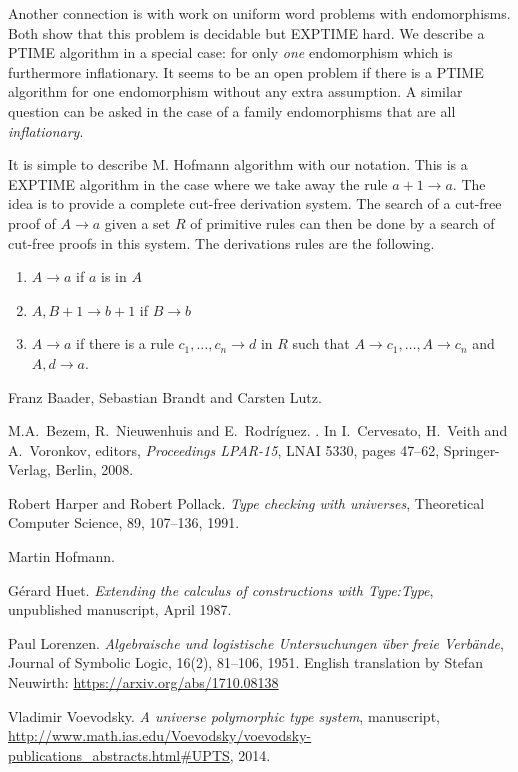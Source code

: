 \documentclass[11pt,a4paper]{article}
\begin{document}
Another connection is with work on uniform word problems with
endomorphisms. Both \cite{Baader,Hofmann} show that this problem is decidable
but EXPTIME hard. We describe a PTIME algorithm in a special case: for
only {\em one} endomorphism which is furthermore inflationary.
It seems to be an open problem if there is a PTIME algorithm for
one endomorphism without any extra assumption. A similar
question can be asked in the case of a family endomorphisms
that are all {\em inflationary}.

It is simple to describe M. Hofmann \cite{Hofmann} algorithm with
our notation. This is a EXPTIME algorithm in the case where
we take away the rule $a+1\to a$. The idea is to provide a complete cut-free
derivation system. The search of a cut-free
proof of $A\to a$ given a set $R$ of primitive rules can then be done by a search of cut-free
proofs in this system. The derivations rules are the following.

\begin{enumerate}
\item $A\to a$ if $a$ is in $A$
\item $A,B+1\to b+1$ if $B\to b$
\item $A\to a$ if there is a rule $c_1,\dots,c_n\to d$ in $R$ such that 
  $A\to c_1,\dots,A\to c_n$ and $A,d\to a$.
\end{enumerate}






\begin{thebibliography}{99}

  Franz Baader, Sebastian Brandt and Carsten Lutz.

M.A.~Bezem, R.~Nieuwenhuis and E.~Rodr\'iguez.
.
In I.~Cervesato, H.~Veith and A.~Voronkov, editors,
\emph{Proceedings LPAR-15}, LNAI 5330,
pages 47--62, Springer-Verlag, Berlin, 2008.

Robert Harper and Robert Pollack.
\newblock\emph{Type checking with universes},
Theoretical Computer Science, 89, 107--136, 1991.

  Martin Hofmann.

G\'erard Huet.
\newblock\emph{Extending the calculus of constructions with {Type:Type}},
\newblock unpublished manuscript, April 1987.

Paul Lorenzen.
  \newblock\emph{Algebraische und logistische Untersuchungen über freie Verbände},
Journal of Symbolic Logic, 16(2), 81--106, 1951.
English translation by Stefan Neuwirth: \url{https://arxiv.org/abs/1710.08138}

  Vladimir Voevodsky.
 \newblock\emph{A universe polymorphic type system},
manuscript, 
 \newblock \url{http://www.math.ias.edu/Voevodsky/voevodsky-publications_abstracts.html\#UPTS}, {2014}.



\end{thebibliography}
\end{document}
